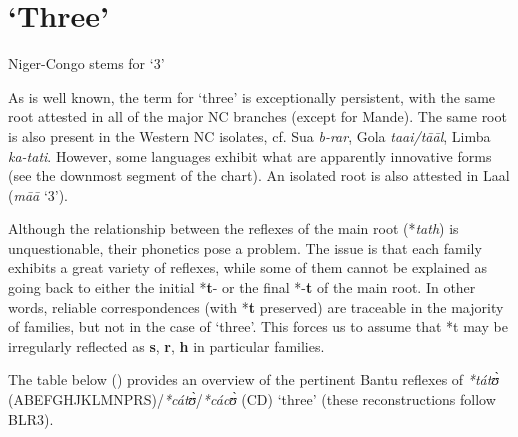 \section{‘Three’} 
\begin{table}
\caption{\label{tab:4:5}Niger-Congo stems for `3'}
\kppyramid
{}


 
\end{table}

As is well known, the term for ‘three’ is exceptionally persistent, with the same root attested in all of the major NC branches (except for Mande). The same root is also present in the Western NC isolates, cf. Sua \textit{b-rar}, Gola \textit{taai/t{\={a}}{\={a}}l}, Limba \textit{ka-tati}. However, some languages exhibit what are apparently innovative forms (see the downmost segment of the chart). An isolated root is also attested in Laal (\textit{m{\={a}}{\={a}}} ‘3’).

Although the relationship between the reflexes of the main root (*\textit{tath}) is unquestionable, their phonetics pose a problem. The issue is that each family exhibits a great variety of reflexes, while some of them cannot be explained as going back to either the initial *\textbf{t}- or the final *-\textbf{t} of the main root. In other words, reliable correspondences (with *\textbf{t} preserved) are traceable in the majority of families, but not in the case of ‘three’. This forces us to assume that *t may be irregularly reflected as \textbf{s}, \textbf{r}, \textbf{h} in particular families.

The table below () provides an overview of the pertinent Bantu reflexes of \textit{*tát{\`{ʊ}}} (ABEFGHJKLMNPRS)/\textit{*cát{\`{ʊ}}}/\textit{*các{\`{ʊ}}}   (CD) ‘three’ (these reconstructions follow BLR3).

